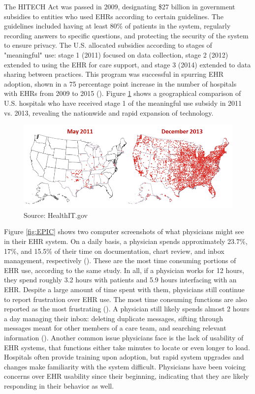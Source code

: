 \documentclass[12pt]{article}
\begin{document}
The HITECH Act was passed in 2009, designating \$27 billion in government subsidies to entities who used EHRs according to certain guidelines. The guidelines included having at least 80\% of patients in the system, regularly recording answers to specific questions, and protecting the security of the system to ensure privacy. The U.S. allocated subsidies according to stages of "meaningful" use: stage 1 (2011) focused on data collection, stage 2 (2012) extended to using the EHR for care support, and stage 3 (2014) extended to data sharing between practices. This program was successful in  spurring EHR adoption, shown in a 75 percentage point increase in the number of hospitals with EHRs from 2009 to 2015 (\cite{stats}). Figure \ref{fig:meanuse} shows a geographical comparison of U.S. hospitals who have received stage 1 of the meaningful use subsidy in 2011 vs. 2013, revealing the nationwide and rapid expansion of technology. 

\begin{figure}[ht]
    \centering
    \captionsetup{width=.6\linewidth}
    \caption{Hospitals Receiving Meaningful Use Stage 1 Subsidy}
    \includegraphics[scale=.6]{Objects/QS-Hospitals-Receiving-Payments-for-MU-and-Adoption.png}
    \caption*{Source: HealthIT.gov}
    \label{fig:meanuse}
\end{figure}

Figure \ref{fig:EPIC} shows two computer screenshots of what physicians might see in their EHR system. On a daily basis, a physician spends approximately 23.7\%, 17\%, and 15.5\% of their time on documentation, chart review, and inbox management, respectively (\cite{arndt2017tethered}). These are the most time consuming portions of EHR use, according to the same study. In all, if a physician works for 12 hours, they spend roughly 3.2 hours with patients and 5.9 hours interfacing with an EHR. Despite a large amount of time spent with them, physicians still continue to report frustration over EHR use. The most time consuming functions are also reported as the most frustrating (\cite{dymek2021building}). A physician still likely spends almost 2 hours a day managing their inbox: deleting duplicate messages, sifting through messages meant for other members of a care team, and searching relevant information (\cite{dymek2021building}). Another common issue physicians face is the lack of usability of EHR systems, that functions either take minutes to locate or even longer to load. Hospitals often provide training upon adoption, but rapid system upgrades and changes make familiarity with the system difficult. Physicians have been voicing concerns over EHR usability since their beginning, indicating that they are likely responding in their behavior as well.
\end{document}
